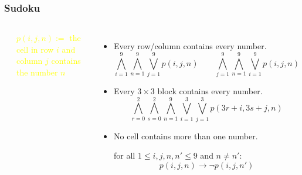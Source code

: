 \documentclass[UTF8,aspectratio=43,11pt,colorlinks,compress,openany]{beamer}%
\begin{document}
\begin{frame}\frametitle{Sudoku}
\begin{columns}
\begin{center}
\end{center}
\centering\textcolor{yellow}{$p(i,j,n):=$ the cell in row $i$ and column $j$ contains the number $n$}
\begin{itemize}
				\item Every row/column contains every number.
				\[\bigwedge\limits_{i=1}^9\bigwedge\limits_{n=1}^9\bigvee\limits_{j=1}^9 p(i,j,n)\qquad\bigwedge\limits_{j=1}^9\bigwedge\limits_{n=1}^9\bigvee\limits_{i=1}^9 p(i,j,n)\]
				\item Every $3\times3$ block contains every number.
				\[\bigwedge\limits_{r=0}^2\bigwedge\limits_{s=0}^2\bigwedge\limits_{n=1}^9\bigvee\limits_{i=1}^3\bigvee\limits_{j=1}^3 p(3r+i,3s+j,n)\]
				\item No cell contains more than one number.
				
				for all $1\leq i,j,n,n'\leq 9$ and $n\neq n'$: \[p(i,j,n)\to\neg p(i,j,n')\]
\end{itemize}
\end{columns}
\end{frame}
\end{document}
